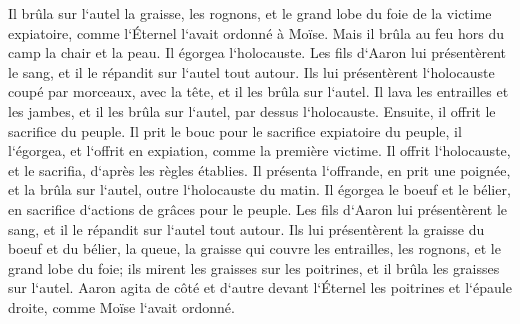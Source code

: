 \verse Il brûla sur l`autel la graisse, les rognons, et le grand lobe du foie de la victime expiatoire, comme l`Éternel l`avait ordonné à Moïse. 
\verse Mais il brûla au feu hors du camp la chair et la peau. 
\verse Il égorgea l`holocauste. Les fils d`Aaron lui présentèrent le sang, et il le répandit sur l`autel tout autour. 
\verse Ils lui présentèrent l`holocauste coupé par morceaux, avec la tête, et il les brûla sur l`autel. 
\verse Il lava les entrailles et les jambes, et il les brûla sur l`autel, par dessus l`holocauste. 
\verse Ensuite, il offrit le sacrifice du peuple. Il prit le bouc pour le sacrifice expiatoire du peuple, il l`égorgea, et l`offrit en expiation, comme la première victime. 
\verse Il offrit l`holocauste, et le sacrifia, d`après les règles établies. 
\verse Il présenta l`offrande, en prit une poignée, et la brûla sur l`autel, outre l`holocauste du matin. 
\verse Il égorgea le boeuf et le bélier, en sacrifice d`actions de grâces pour le peuple. Les fils d`Aaron lui présentèrent le sang, et il le répandit sur l`autel tout autour. 
\verse Ils lui présentèrent la graisse du boeuf et du bélier, la queue, la graisse qui couvre les entrailles, les rognons, et le grand lobe du foie; 
\verse ils mirent les graisses sur les poitrines, et il brûla les graisses sur l`autel. 
\verse Aaron agita de côté et d`autre devant l`Éternel les poitrines et l`épaule droite, comme Moïse l`avait ordonné. 
